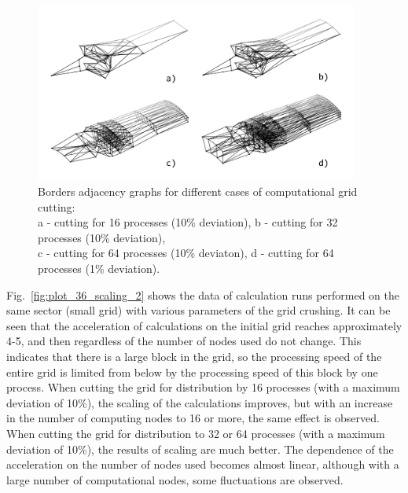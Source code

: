 \documentclass[
11pt,%
tightenlines,%
twoside,%
onecolumn,%
nofloats,%
nobibnotes,%
nofootinbib,%
superscriptaddress,%
noshowpacs,%
centertags]%
{revtex4}
\begin{document}
\begin{figure}[h]
\setcaptionmargin{5mm}
\onelinecaptionsfalse
\includegraphics[width=0.95\textwidth]{pics/g_36_2.pdf}
\caption{Borders adjacency graphs for different cases of computational grid cutting: \\ a - cutting for 16 processes (10\% deviation), b - cutting for 32 processes (10\% deviation), \\ c - cutting for 64 processes (10\% deviaton), d - cutting for 64 processes (1\% deviation).}
\label{fig:g_36_2}
\end{figure}

Fig.~\ref{fig:plot_36_scaling_2} shows the data of calculation runs performed on the same sector (small grid) with various parameters of the grid crushing.
It can be seen that the acceleration of calculations on the initial grid reaches approximately 4-5, and then regardless of the number of nodes used do not change.
This indicates that there is a large block in the grid, so the processing speed of the entire grid is limited from below by the processing speed of this block by one process.
When cutting the grid for distribution by 16 processes (with a maximum deviation of 10\%), the scaling of the calculations improves, but with an increase in the number of computing nodes to 16 or more, the same effect is observed.
When cutting the grid for distribution to 32 or 64 processes (with a maximum deviation of 10\%), the results of scaling are much better.
The dependence of the acceleration on the number of nodes used becomes almost linear, although with a large number of computational nodes, some fluctuations are observed.
\end{document}
